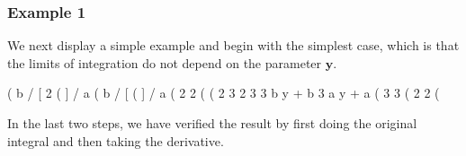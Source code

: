 \documentclass[12pt]{article}
\begin{document}
\subsubsection*{Example 1}
We next display a simple example and begin with the simplest case,
 which is that the limits of integration do not depend on the parameter $\mathbf{y}$.
\begin{myVerbatim}
(%
                               b
                              /
                              [            2
(%
                              ]
                              /
                               a
(%
                                      b
                                     /
                                     [
(%
                                     ]
                                     /
                                      a
(%
                                     2    2
(%
(%
                              2      3      2      3
                           3 b  y + b    3 a  y + a
(%
                                3             3
(%
                                     2    2
(%
\end{myVerbatim} 
In the last two steps, we have verified the result by first doing the original integral
  and then taking the derivative.
\end{document}
